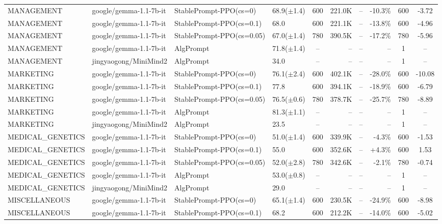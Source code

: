 {\begin{longtable}{@{}p{5.5cm}p{4.5cm}p{2.5cm}lcrrrcc@{}}
\midrule
MANAGEMENT & google/gemma-1.1-7b-it & StablePrompt-PPO(cs=0) & 68.9($\pm$1.4) & 600 & 221.0K & -- & -10.3\% & 600 & -3.72 \\
MANAGEMENT & google/gemma-1.1-7b-it & StablePrompt-PPO(cs=0.1) & 68.0 & 600 & 221.1K & -- & -13.8\% & 600 & -4.96 \\
MANAGEMENT & google/gemma-1.1-7b-it & StablePrompt-PPO(cs=0.05) & 67.0($\pm$1.4) & 780 & 390.5K & -- & -17.2\% & 780 & -5.96 \\
MANAGEMENT & google/gemma-1.1-7b-it & AlgPrompt & 71.8($\pm$1.4) & -- & -- & -- & -- & 1 & -- \\
\midrule
MANAGEMENT & jingyaogong/MiniMind2 & AlgPrompt & 34.0 & -- & -- & -- & -- & 1 & -- \\
\midrule
MARKETING & google/gemma-1.1-7b-it & StablePrompt-PPO(cs=0) & 76.1($\pm$2.4) & 600 & 402.1K & -- & -28.0\% & 600 & -10.08 \\
MARKETING & google/gemma-1.1-7b-it & StablePrompt-PPO(cs=0.1) & 77.8 & 600 & 394.1K & -- & -18.9\% & 600 & -6.79 \\
MARKETING & google/gemma-1.1-7b-it & StablePrompt-PPO(cs=0.05) & 76.5($\pm$0.6) & 780 & 378.7K & -- & -25.7\% & 780 & -8.89 \\
MARKETING & google/gemma-1.1-7b-it & AlgPrompt & 81.3($\pm$1.1) & -- & -- & -- & -- & 1 & -- \\
\midrule
MARKETING & jingyaogong/MiniMind2 & AlgPrompt & 23.5 & -- & -- & -- & -- & 1 & -- \\
\midrule
MEDICAL\_GENETICS & google/gemma-1.1-7b-it & StablePrompt-PPO(cs=0) & 51.0($\pm$1.4) & 600 & 339.9K & -- & -4.3\% & 600 & -1.53 \\
MEDICAL\_GENETICS & google/gemma-1.1-7b-it & StablePrompt-PPO(cs=0.1) & 55.0 & 600 & 352.6K & -- & +4.3\% & 600 & 1.53 \\
MEDICAL\_GENETICS & google/gemma-1.1-7b-it & StablePrompt-PPO(cs=0.05) & 52.0($\pm$2.8) & 780 & 342.6K & -- & -2.1\% & 780 & -0.74 \\
MEDICAL\_GENETICS & google/gemma-1.1-7b-it & AlgPrompt & 53.0($\pm$0.8) & -- & -- & -- & -- & 1 & -- \\
\midrule
MEDICAL\_GENETICS & jingyaogong/MiniMind2 & AlgPrompt & 29.0 & -- & -- & -- & -- & 1 & -- \\
\midrule
MISCELLANEOUS & google/gemma-1.1-7b-it & StablePrompt-PPO(cs=0) & 65.1($\pm$1.4) & 600 & 230.5K & -- & -24.9\% & 600 & -8.98 \\
MISCELLANEOUS & google/gemma-1.1-7b-it & StablePrompt-PPO(cs=0.1) & 68.2 & 600 & 212.2K & -- & -14.0\% & 600 & -5.02 \\

\end{longtable}}
